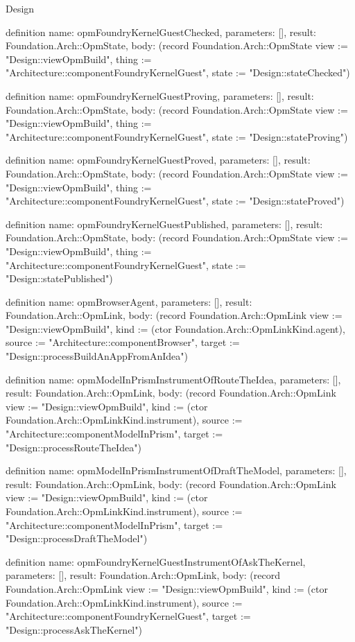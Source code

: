 \begin{lexlean}{Design}
\begin{semanticmodule}
definition{
  name: opmFoundryKernelGuestChecked,
  parameters: [],
  result: Foundation.Arch::OpmState,
  body: (record Foundation.Arch::OpmState {view := "Design::viewOpmBuild", thing := "Architecture::componentFoundryKernelGuest", state := "Design::stateChecked"})
}

definition{
  name: opmFoundryKernelGuestProving,
  parameters: [],
  result: Foundation.Arch::OpmState,
  body: (record Foundation.Arch::OpmState {view := "Design::viewOpmBuild", thing := "Architecture::componentFoundryKernelGuest", state := "Design::stateProving"})
}

definition{
  name: opmFoundryKernelGuestProved,
  parameters: [],
  result: Foundation.Arch::OpmState,
  body: (record Foundation.Arch::OpmState {view := "Design::viewOpmBuild", thing := "Architecture::componentFoundryKernelGuest", state := "Design::stateProved"})
}

definition{
  name: opmFoundryKernelGuestPublished,
  parameters: [],
  result: Foundation.Arch::OpmState,
  body: (record Foundation.Arch::OpmState {view := "Design::viewOpmBuild", thing := "Architecture::componentFoundryKernelGuest", state := "Design::statePublished"})
}

definition{
  name: opmBrowserAgent,
  parameters: [],
  result: Foundation.Arch::OpmLink,
  body: (record Foundation.Arch::OpmLink {view := "Design::viewOpmBuild", kind := (ctor Foundation.Arch::OpmLinkKind.agent), source := "Architecture::componentBrowser", target := "Design::processBuildAnAppFromAnIdea"})
}

definition{
  name: opmModelInPrismInstrumentOfRouteTheIdea,
  parameters: [],
  result: Foundation.Arch::OpmLink,
  body: (record Foundation.Arch::OpmLink {view := "Design::viewOpmBuild", kind := (ctor Foundation.Arch::OpmLinkKind.instrument), source := "Architecture::componentModelInPrism", target := "Design::processRouteTheIdea"})
}

definition{
  name: opmModelInPrismInstrumentOfDraftTheModel,
  parameters: [],
  result: Foundation.Arch::OpmLink,
  body: (record Foundation.Arch::OpmLink {view := "Design::viewOpmBuild", kind := (ctor Foundation.Arch::OpmLinkKind.instrument), source := "Architecture::componentModelInPrism", target := "Design::processDraftTheModel"})
}

definition{
  name: opmFoundryKernelGuestInstrumentOfAskTheKernel,
  parameters: [],
  result: Foundation.Arch::OpmLink,
  body: (record Foundation.Arch::OpmLink {view := "Design::viewOpmBuild", kind := (ctor Foundation.Arch::OpmLinkKind.instrument), source := "Architecture::componentFoundryKernelGuest", target := "Design::processAskTheKernel"})
}


\end{semanticmodule}
\end{lexlean}

